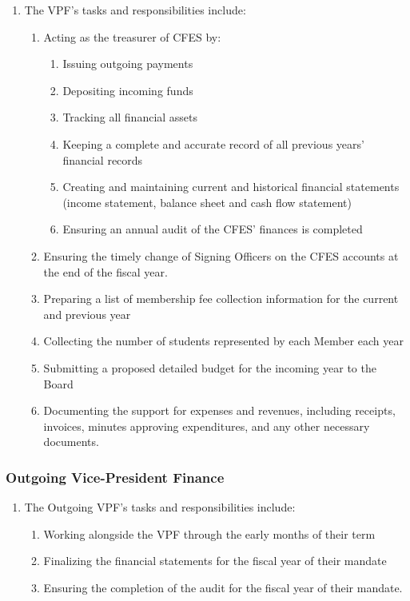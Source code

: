 \begin{enumerate}
 \item The VPF’s tasks and responsibilities include:
  \begin{enumerate}
   \item Acting as the treasurer of CFES by:
    \begin{enumerate}
     \item Issuing outgoing payments
     \item Depositing incoming funds
     \item Tracking all financial assets
     \item Keeping a complete and accurate record of all previous years’ financial records
     \item Creating and maintaining current and historical financial statements (income statement, balance sheet and cash flow statement)
     \item Ensuring an annual audit of the CFES’ finances is completed
    \end{enumerate}
   \item Ensuring the timely change of Signing Officers on the CFES accounts at the end of the fiscal year.
   \item Preparing a list of membership fee collection information for the current and previous year
   \item Collecting the number of students represented by each Member each year
   \item Submitting a proposed detailed budget for the incoming year to the Board
   \item Documenting the support for expenses and revenues, including receipts, invoices, minutes approving expenditures, and any other necessary documents.
  \end{enumerate}
\end{enumerate}

\setcounter{subsubsection}{1}
\subsubsection{Outgoing Vice-President Finance}
\label{vice-president-finance-vpf-outgoing-vice-president-finance}

\begin{enumerate}
 \item The Outgoing VPF’s tasks and responsibilities include:
  \begin{enumerate}
   \item Working alongside the VPF through the early months of their term
   \item Finalizing the financial statements for the fiscal year of their mandate
   \item Ensuring the completion of the audit for the fiscal year of their mandate.
  \end{enumerate}
\end{enumerate}

